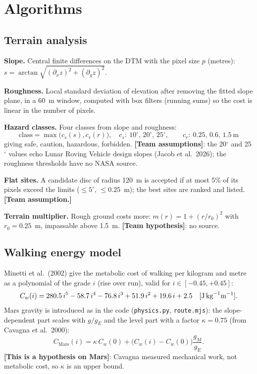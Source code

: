 \documentclass[11pt,a4paper]{article}
\newcommand{\hyp}[1]{\textcolor{marsred}{\textbf{[#1]}}}   %
\renewcommand{\_}{\textunderscore\allowbreak}
\newcommand{\code}[1]{\texttt{#1}}
\begin{document}
\section{Algorithms}
\subsection{Terrain analysis}\label{sec:terrain}
\textbf{Slope.} Central finite differences on the DTM with the pixel size $p$ (metres): $s=\arctan\!\sqrt{(\partial_x z)^2+(\partial_y z)^2}$.

\textbf{Roughness.} Local standard deviation of elevation after removing the fitted slope plane, in a 60~m window, computed with box filters (running sums) so the cost is linear in the number of pixels.

\textbf{Hazard classes.} Four classes from slope and roughness:
\[
\text{class}=\max\big(c_s(s),c_r(r)\big),\quad
c_s:\ 10^\circ,\,20^\circ,\,25^\circ,\qquad c_r:\ 0.25,\,0.6,\,1.5\ \text{m}
\]
giving safe, caution, hazardous, forbidden. \hyp{Team assumptions}: the 20$^\circ$ and 25$^\circ$ values echo Lunar Roving Vehicle design slopes (Jacob et al.\ 2026); the roughness thresholds have no NASA source.

\textbf{Flat sites.} A candidate disc of radius 120~m is accepted if at most 5\% of its pixels exceed the limits ($\le5^\circ$, $\le0.25$~m); the best sites are ranked and listed. \hyp{Team assumption.}

\textbf{Terrain multiplier.} Rough ground costs more: $m(r)=1+(r/r_0)^2$ with $r_0=0.25$~m, impassable above 1.5~m. \hyp{Team hypothesis}: no source.

\subsection{Walking energy model}\label{sec:energy}
Minetti et al.\ (2002) give the metabolic cost of walking per kilogram and metre as a polynomial of the grade $i$ (rise over run), valid for $i\in[-0.45,+0.45]$:
\[
C_w(i)=280.5\,i^5-58.7\,i^4-76.8\,i^3+51.9\,i^2+19.6\,i+2.5\quad[\text{J\,kg}^{-1}\text{m}^{-1}].
\]
Mars gravity is introduced as in the code (\code{physics.py}, \code{route.mjs}): the slope-dependent part scales with $g/g_E$ and the level part with a factor $\kappa=0.75$ (from Cavagna et al.\ 2000):
\[
C_\text{Mars}(i)=\kappa\,C_w(0)+\big(C_w(i)-C_w(0)\big)\frac{g_M}{g_E}.
\]
\hyp{This is a hypothesis on Mars}: Cavagna measured mechanical work, not metabolic cost, so $\kappa$ is an upper bound.
\end{document}
